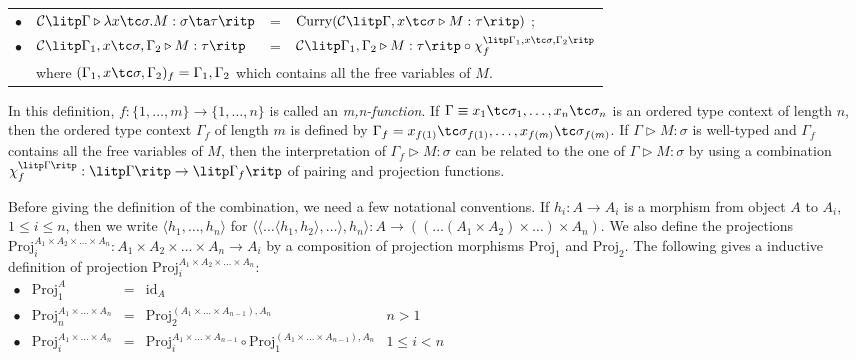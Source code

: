 \begin{definition}
\begin{myitemize}
\begin{tabular}{rlcl}
  $ \bullet $ & $ \mathcal{C} \litp \Gamma \triangleright \lambda x \tc \sigma .M: \sigma \ta \tau \ritp $ & = & $ \text{Curry}( \mathcal{C} \litp \Gamma , x \tc \sigma \triangleright M: \tau \ritp ) $ ; \\[5pt]
  $ \bullet $ & $ \mathcal{C} \litp \Gamma _1 , x \tc \sigma , \Gamma _2 \triangleright M: \tau \ritp $ & = & $ \mathcal{C} \litp \Gamma _1 , \Gamma _2 \triangleright M: \tau \ritp \circ \chi_f^{\litp \Gamma _1 , x \tc \sigma , \Gamma _2 \ritp} $ \\[5pt]
  & \multicolumn{3}{l}{where $ ( \Gamma _1 , x \tc \sigma , \Gamma _2 )_f = \Gamma _1 , \Gamma _2 $ which contains all the free variables of $ M $.} \\[5pt]
  \end{tabular}
\end{myitemize}
\end{definition}

In this definition, $ f: \{ 1, \ldots , m \} \to \{ 1, \ldots , n \} $ is called an \emph{m,n-function}. If $ \Gamma \equiv x_1 \tc \sigma_1, \ldots , x_n \tc \sigma_n $ is an ordered type context of length $ n $, then the ordered type context $ \Gamma_f $ of length $ m $ is defined by $ \Gamma_f = x_{f(1)} \tc \sigma_{f(1)}, \ldots , x_{f(m)} \tc \sigma_{f(m)} $. If $ \Gamma \triangleright M: \sigma $ is well-typed and $ \Gamma_f $ contains all the free variables of $ M $, then the interpretation of $ \Gamma_f \triangleright M: \sigma $ can be related to the one of $ \Gamma \triangleright M: \sigma $ by using a combination $ \chi_f^{\litp \Gamma \ritp} : \litp \Gamma \ritp \to \litp \Gamma_f \ritp $ of pairing and projection functions.

Before giving the definition of the combination, we need a few notational conventions. If $ h_i:A \to A_i $ is a morphism from object $ A $ to $ A_i $, $ 1 \leq i \leq n $, then we write $ \langle h_1, \ldots , h_n \rangle $ for $ \langle \langle \ldots \langle h_1,h_2 \rangle, \ldots \rangle , h_n \rangle : A \to (( \ldots (A_1 \times A_2) \times \ldots ) \times A_n ) $. We also define the projections $ \text{Proj}_i^{A_1 \times A_2 \times \ldots \times A_n} : A_1 \times A_2 \times \ldots \times A_n \to A_i $ by a composition of projection morphisms $ \text{Proj}_1 $ and $ \text{Proj}_2 $. The following gives a inductive definition of projection $ \text{Proj}_i^{A_1 \times A_2 \times \ldots \times A_n} $:\\[5pt]
$
\begin{array}{rlcll}
\bullet & \text{Proj}_1^{A} & = & \text{id}_A & \\[5pt]
\bullet & \text{Proj}_n^{A_1 \times \ldots \times A_n} & = & \text{Proj}_2^{(A_1 \times \ldots \times A_{n-1}), A_n} & n > 1 \\[5pt]
\bullet & \text{Proj}_i^{A_1 \times \ldots \times A_n} & = & \text{Proj}_i^{A_1 \times \ldots \times A_{n-1}} \circ \text{Proj}_1^{(A_1 \times \ldots \times A_{n-1}), A_n} & 1 \leq i < n \\[10pt]
\end{array}
$

